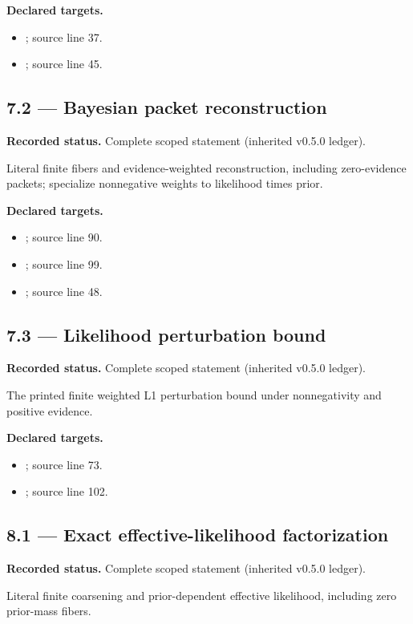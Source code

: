 \textbf{Declared targets.}\begin{itemize}
\item {}; source line 37.
\item {}; source line 45.
\end{itemize}
\subsection{7.2 — Bayesian packet reconstruction}
\label{result:7.2}
\textbf{Recorded status.} Complete scoped statement (inherited v0.5.0 ledger).\par
Literal finite fibers and evidence-weighted reconstruction, including zero-evidence packets; specialize nonnegative weights to likelihood times prior.

\textbf{Declared targets.}\begin{itemize}
\item {}; source line 90.
\item {}; source line 99.
\item {}; source line 48.
\end{itemize}
\subsection{7.3 — Likelihood perturbation bound}
\label{result:7.3}
\textbf{Recorded status.} Complete scoped statement (inherited v0.5.0 ledger).\par
The printed finite weighted L1 perturbation bound under nonnegativity and positive evidence.

\textbf{Declared targets.}\begin{itemize}
\item {}; source line 73.
\item {}; source line 102.
\end{itemize}
\subsection{8.1 — Exact effective-likelihood factorization}
\label{result:8.1}
\textbf{Recorded status.} Complete scoped statement (inherited v0.5.0 ledger).\par
Literal finite coarsening and prior-dependent effective likelihood, including zero prior-mass fibers.

